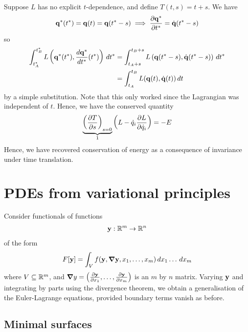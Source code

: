 \documentclass{../../template/note}
\begin{document}
    \begin{example*}
        Suppose $L$ has no explicit $t$-dependence, and define $T(t, s) = t+s$. We have
        \begin{align*}
            \V q^*(t^*) = \V q(t) = \V q(t^* - s) \implies \pd{\V q^*}{t^*} = \dot{\V q}(t^*-s)
        \end{align*}
        so
        \begin{align*}
            \int_{t_A^*}^{t_B^*} L\left(\V q^*(t^*), \frac{d \V q^*}{dt^*}(t^*)\right) \D t^* &= \int_{t_A+s}^{t_B+s} L\left(\V q(t^*-s), \dot{\V q}(t^*-s)\right) \D t^* \\
            &= \int_{t_A}^{t_B} L(\V q(t), \dot{\V q}(t)) \D t
        \end{align*}
        by a simple substitution. Note that this only worked since the Lagrangian was independent of $t$. Hence, we have the conserved quantity
        \begin{align*}
            \underbrace{\left(\pd{T}{s}\right)_{s=0}}_1 \left(L - \dot q_i \pd{L}{\dot q_i}\right) = -E
        \end{align*}
        Hence, we have recovered conservation of energy as a consequence of invariance under time translation.      
    \end{example*}

    \section{PDEs from variational principles}

    Consider functionals of functions
    \begin{align*}
        \V y: \RR^m \to \RR^n
    \end{align*}
    of the form
    \begin{align*}
        F[\V y] = \int_V f(\V y, \grad \V y, x_1, \dots, x_m) \D x_1 \dots \D x_m
    \end{align*}
    where $V \subseteq \mathbb R^m$, and $\grad y = \left(\pd{\V y}{x_1}, \dots, \pd{\V y}{x_m}\right)$ is an $m$ by $n$ matrix. Varying $\V y$ and integrating by parts using the divergence theorem, we obtain a generalisation of the Euler-Lagrange equations, provided boundary terms vanish as before.

    \subsection{Minimal surfaces}
\end{document}
